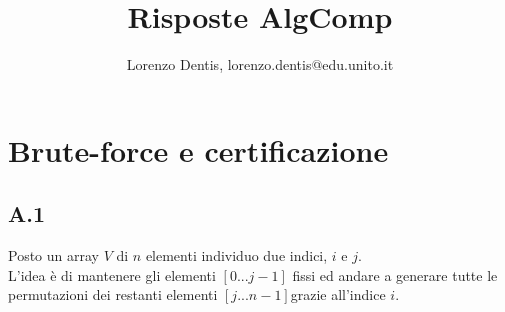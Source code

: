 \documentclass[a4paper]{article}
\begin{document}
\author{Lorenzo Dentis, lorenzo.dentis@edu.unito.it}
\title{Risposte AlgComp}
\maketitle

\section{Brute-force e certificazione}
\subsection{A.1}
Posto un array $V$ di $n$ elementi individuo due indici, $i$ e $j$.\\L'idea è di mantenere gli elementi $[0 ... j-1]$ fissi ed andare a generare tutte le permutazioni dei restanti elementi $[j ... n-1]$grazie all'indice $i$.
\end{document}
